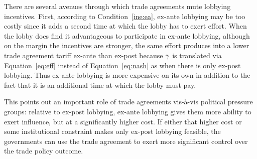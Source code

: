 There are several avenues through which trade agreements mute lobbying incentives. First, according to Condition~\ref{ine:ea}, ex-ante lobbying may be too costly since it adds a second time at which the lobby has to exert effort. When the lobby does find it advantageous to participate in ex-ante lobbying, although on the margin the incentives are stronger, the same effort produces into a lower trade agreement tariff ex-ante than ex-post because $\gamma$ is translated via Equation~\ref{eq:eff} instead of Equation~\ref{eq:nash} as when there is only ex-post lobbying. Thus ex-ante lobbying is more expensive on its own in addition to the fact that it is an additional time at which the lobby must pay.

This points out an important role of trade agreements vis-\`{a}-vis political pressure groups: relative to ex-post lobbying, ex-ante lobbying gives them more ability to exert influence, but at a significantly higher cost. If either that higher cost or some institutional constraint makes only ex-post lobbying feasible, the governments can use the trade agreement to exert more significant control over the trade policy outcome.

%